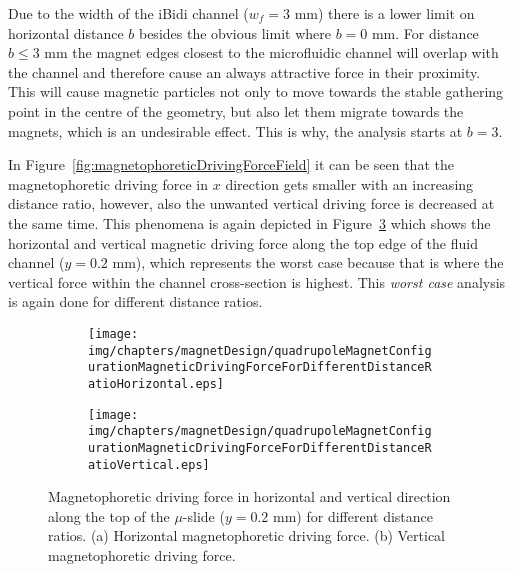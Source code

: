 Due to the width of the iBidi channel ($w_{f}=3$ mm) there is a lower limit on horizontal distance $b$ besides the obvious limit where $b=0$ mm. For distance $b \leq 3$ mm the magnet edges closest to the microfluidic channel will overlap with the channel and therefore cause an always attractive force in their proximity. This will cause magnetic particles not only to move towards the stable gathering point in the centre of the geometry, but also let them migrate towards the magnets, which is an undesirable effect. This is why, the analysis starts at $b=3$.  

In Figure~\ref{fig:magnetophoreticDrivingForceField} it can be seen that the magnetophoretic driving force in $x$ direction gets smaller with an increasing distance ratio, however, also the unwanted vertical driving force is decreased at the same time. This phenomena is again depicted in Figure~\ref{fig:quadrupoleMagnetConfigurationMagneticDrivingForceForDistanceRatio} which shows the horizontal and vertical magnetic driving force along the top edge of the fluid channel ($y=0.2$ mm), which represents the worst case because that is where the vertical force within the channel cross-section is highest. This \textit{worst case} analysis is again done for different distance ratios.

\begin{figure}[htb]
\centering
	\begin{subfigure}[b]{0.48\textwidth}
		\texttt{[image: img/chapters/magnetDesign/quadrupoleMagnetConfigurationMagneticDrivingForceForDifferentDistanceRatioHorizontal.eps]}
	\caption{}
    \label{fig:quadrupoleMagnetConfigurationMagneticDrivingForceForDistanceRatio_horizontal}
    \end{subfigure}
    \hfill
	\begin{subfigure}[b]{0.48\textwidth}
		\texttt{[image: img/chapters/magnetDesign/quadrupoleMagnetConfigurationMagneticDrivingForceForDifferentDistanceRatioVertical.eps]}
	\caption{}
	\label{fig:quadrupoleMagnetConfigurationMagneticDrivingForceForDistanceRatio_vertical}
	\end{subfigure}
\caption[Magnetophoretic driving force in horizontal and vertical direction along the top of the iBidi $\mu$-slide]{Magnetophoretic driving force in horizontal and vertical direction along the top of the $\mu$-slide ($y=0.2$ mm) for different distance ratios. (a) Horizontal magnetophoretic driving force. (b) Vertical magnetophoretic driving force.}%
\label{fig:quadrupoleMagnetConfigurationMagneticDrivingForceForDistanceRatio}
\end{figure}

